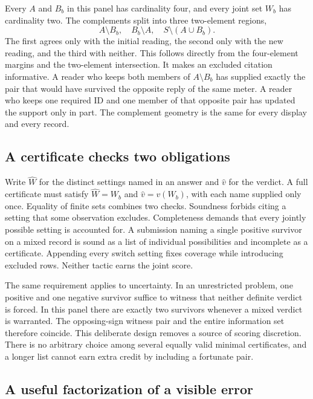 \documentclass[12pt,letterpaper]{article}
\begin{document}
Every $A$ and $B_b$ in this panel has cardinality four, and every joint set $W_b$ has cardinality two. The complements split into three two-element regions,
\[
 A\setminus B_b,\quad B_b\setminus A,\quad S\setminus(A\cup B_b).
\]
The first agrees only with the initial reading, the second only with the new reading, and the third with neither. This follows directly from the four-element margins and the two-element intersection. It makes an excluded citation informative. A reader who keeps both members of $A\setminus B_b$ has supplied exactly the pair that would have survived the opposite reply of the same meter. A reader who keeps one required ID and one member of that opposite pair has updated the support only in part. The complement geometry is the same for every display and every record.

\subsection{A certificate checks two obligations}

Write $\widehat W$ for the distinct settings named in an answer and $\widehat v$ for the verdict. A full certificate must satisfy $\widehat W=W_b$ and $\widehat v=v(W_b)$, with each name supplied only once. Equality of finite sets combines two checks. Soundness forbids citing a setting that some observation excludes. Completeness demands that every jointly possible setting is accounted for. A submission naming a single positive survivor on a mixed record is sound as a list of individual possibilities and incomplete as a certificate. Appending every switch setting fixes coverage while introducing excluded rows. Neither tactic earns the joint score.

The same requirement applies to uncertainty. In an unrestricted problem, one positive and one negative survivor suffice to witness that neither definite verdict is forced. In this panel there are exactly two survivors whenever a mixed verdict is warranted. The opposing-sign witness pair and the entire information set therefore coincide. This deliberate design removes a source of scoring discretion. There is no arbitrary choice among several equally valid minimal certificates, and a longer list cannot earn extra credit by including a fortunate pair.

\subsection{A useful factorization of a visible error}
\end{document}
